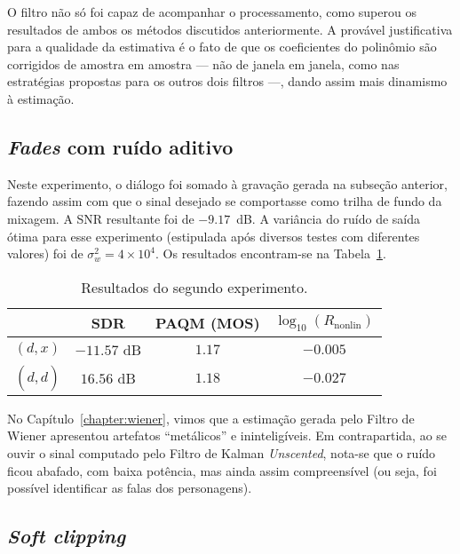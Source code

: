 O filtro não só foi capaz de acompanhar o processamento, como superou os resultados de ambos os métodos discutidos anteriormente. A provável justificativa para a qualidade da estimativa é o fato de que os coeficientes do polinômio são corrigidos de amostra em amostra --- não de janela em janela, como nas estratégias propostas para os outros dois filtros ---, dando assim mais dinamismo à estimação.

\subsection{\textit{Fades} com ruído aditivo}

Neste experimento, o diálogo foi somado à gravação gerada na subseção anterior, fazendo assim com que o sinal desejado se comportasse como trilha de fundo da mixagem. A SNR resultante foi de $-9.17$~dB. A variância do ruído de saída ótima para esse experimento (estipulada após diversos testes com diferentes valores) foi de $\sigma_w^2 = 4 \times 10^{4}$. Os resultados encontram-se na Tabela~\ref{tab:unscented:experiment-2}.
{\def\arraystretch{1.25}\tabcolsep=10pt
\begin{table}[!ht]
    \centering
    \caption[Resultados do segundo experimento: \textit{fades} com ruído aditivo]{Resultados do segundo experimento.}
    \label{tab:unscented:experiment-2}
    \begin{tabular}{cccc}
        \toprule
                         & SDR        & PAQM (MOS)   & $\log_{10}(R_{\text{nonlin}})$ \\
        \midrule
        $(d, x)$       & $-11.57$ dB & $1.17$  &  $-0.005$               \\
        $(d, \hat{d})$ & $16.56$ dB & $1.18$  &   $-0.027$              \\ \bottomrule
    \end{tabular}
\end{table}
}

No Capítulo~\ref{chapter:wiener}, vimos que a estimação gerada pelo Filtro de Wiener apresentou artefatos ``metálicos'' e ininteligíveis. Em contrapartida, ao se ouvir o sinal computado pelo Filtro de Kalman \textit{Unscented}, nota-se que o ruído ficou abafado, com baixa potência, mas ainda assim compreensível (ou seja, foi possível identificar as falas dos personagens).

\subsection{\textit{Soft clipping}}

